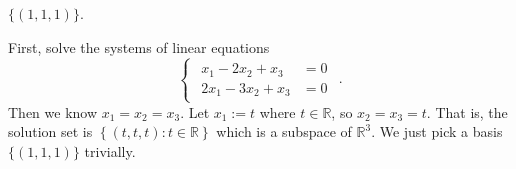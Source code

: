 \begin{Exercise}
	\begin{answer}
		$\{(1,1,1)\}$.
	\end{answer}
	\begin{solution}
		First, solve the systems of linear equations
		$$
		\begin{cases}
		\begin{aligned}
		x_1-2x_2+x_3 &= 0 \\
		2x_1-3x_2+x_3 &= 0
		\end{aligned}
		\end{cases}.
		$$
		Then we know $x_1 = x_2 = x_3$. Let $x_1 := t$ where $t\in\mathbb{R}$, so $x_2 = x_3 = t$. That is, the solution set is $\left\{ (t,t,t):t\in\mathbb{R} \right\}$ which is a subspace of $\mathbb{R}^3$. We just pick a basis $\{(1,1,1)\}$ trivially.
	\end{solution}
\end{Exercise}